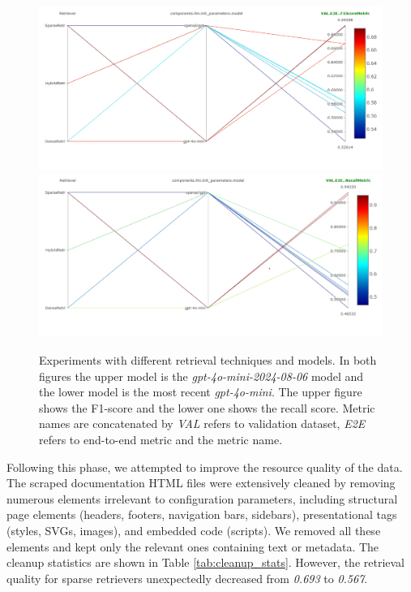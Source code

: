 \begin{figure}[!ht]
    \centering
    \includegraphics[width=\textwidth]{images/RetrievalTypes-vs-LLM-f1.png}\\[6pt]
    \includegraphics[width=\textwidth]{images/RetrievalTypes-vs-LLM-Recall.png}
    \caption{Experiments with different retrieval techniques and models. In both figures the upper model is the \textit{gpt-4o-mini-2024-08-06} model and the lower model is the most recent \textit{gpt-4o-mini}. The upper figure shows the F1-score and the lower one shows the recall score. Metric names are concatenated by \textit{VAL} refers to validation dataset, \textit{E2E} refers to end-to-end metric and the metric name.}
    \label{fig:conf-phase-0-retrievers}
\end{figure}

Following this phase, we attempted to improve the resource quality of the data. The scraped documentation HTML files were extensively cleaned by removing numerous elements irrelevant to configuration parameters, including structural page elements (headers, footers, navigation bars, sidebars), presentational tags (styles, SVGs, images), and embedded code (scripts). We removed all these elements and kept only the relevant ones containing text or metadata. The cleanup statistics are shown in Table \ref{tab:cleanup_stats}. However, the retrieval quality for sparse retrievers unexpectedly decreased from \textit{0.693} to \textit{0.567}.

